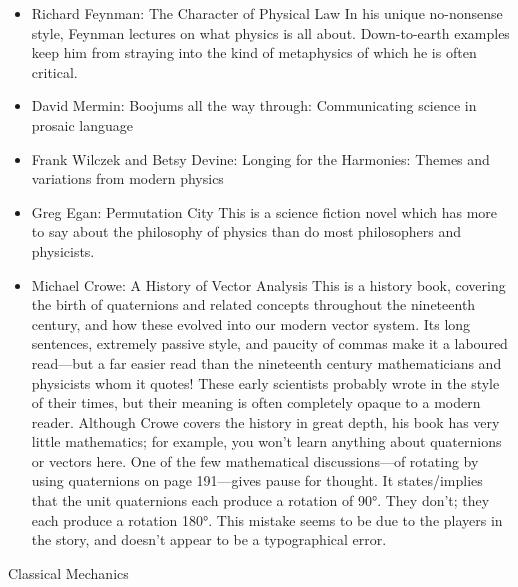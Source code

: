 \documentclass[10pt,a4paper]{book}
\theoremstyle{definition}
\begin{document}
\begin{itemize}
\item Richard Feynman: The Character of Physical Law
In his unique no-nonsense style, Feynman lectures on what physics is all about.  Down-to-earth examples keep him from straying into the kind of metaphysics of which he is often critical.
\item David Mermin: Boojums all the way through: Communicating science in prosaic language
\item Frank Wilczek and Betsy Devine: Longing for the Harmonies: Themes and variations from modern physics
\item Greg Egan: Permutation City
This is a science fiction novel which has more to say about the philosophy of physics than do most philosophers and physicists.
\item Michael Crowe: A History of Vector Analysis
This is a history book, covering the birth of quaternions and related concepts throughout the nineteenth century, and how these evolved into our modern vector system.  Its long sentences, extremely passive style, and paucity of commas make it a laboured read—but a far easier read than the nineteenth century mathematicians and physicists whom it quotes!  These early scientists probably wrote in the style of their times, but their meaning is often completely opaque to a modern reader.  Although Crowe covers the history in great depth, his book has very little mathematics; for example, you won't learn anything about quaternions or vectors here.  One of the few mathematical discussions—of rotating by using quaternions on page 191—gives pause for thought.  It states/implies that the unit quaternions each produce a rotation of 90°.  They don't; they each produce a rotation 180°.  This mistake seems to be due to the players in the story, and doesn't appear to be a typographical error.
\end{itemize}


Classical Mechanics
\end{document}

